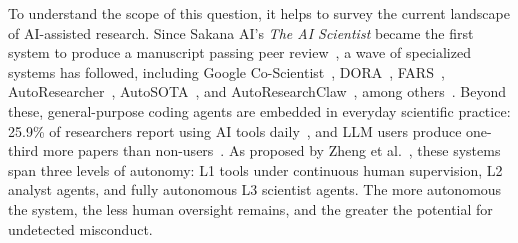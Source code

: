 \documentclass{article}
\begin{document}


To understand the scope of this question, it helps to survey the current landscape of AI-assisted research.
Since Sakana AI's \textit{The AI Scientist} became the first system to produce a manuscript passing peer review~\cite{lu2024aiscientist,aiscientistv2}, a wave of specialized systems has followed, including Google Co-Scientist~\cite{google2025coScientist}, DORA~\cite{dora2025}, FARS~\cite{fars2026}, AutoResearcher~\cite{zhou2026trustresearcherautomatingknowledgegroundedtransparent}, AutoSOTA~\cite{autosota2026}, and AutoResearchClaw~\cite{liu2026autoresearchclaw}, among others~\cite{tie2025survey,ai4research2025survey}.
Beyond these, general-purpose coding agents are embedded in everyday scientific practice: 25.9\% of researchers report using AI tools daily~\cite{whousesai2025}, and LLM users produce one-third more papers than non-users~\cite{kusumegi2025llmscience}.
As proposed by Zheng et al.~\cite{zheng2025automation}, these systems span three levels of autonomy: L1 tools under continuous human supervision, L2 analyst agents, and fully autonomous L3 scientist agents. The more autonomous the system, the less human oversight remains, and the greater the potential for undetected misconduct.






\end{document}
